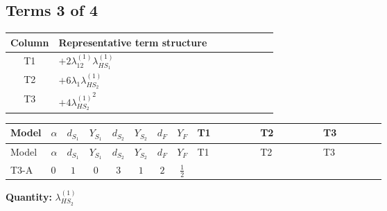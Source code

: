 \documentclass[8pt]{article}
\begin{document}
\begin{landscape}
\subsection*{Terms 3 of 4}
\begin{center}
\begin{tabular}{@{}c >{\raggedright\arraybackslash}p{0.82\linewidth}@{}}
\toprule
Column & Representative term structure \\
\midrule
T1 & \(\displaystyle +2 {\lambda_{12}^{(1)}} {\lambda_{HS_1}^{(1)}}\) \\
\midrule
T2 & \(\displaystyle +6 {\lambda_1} {\lambda_{HS_2}^{(1)}}\) \\
\midrule
T3 & \(\displaystyle +4 {\lambda_{HS_2}^{(1)}}^2\) \\
\midrule
\bottomrule
\end{tabular}
\end{center}
\smallskip
\tiny
\begin{longtable}{@{}llcccccc >{\raggedright\arraybackslash}p{0.21\linewidth} >{\raggedright\arraybackslash}p{0.21\linewidth} >{\raggedright\arraybackslash}p{0.21\linewidth}@{}}
\toprule
Model & $\alpha$ & $d_{S_1}$ & $Y_{S_1}$ & $d_{S_2}$ & $Y_{S_2}$ & $d_F$ & $Y_F$ & T1 & T2 & T3 \\
\midrule
\endfirsthead
\toprule
Model & $\alpha$ & $d_{S_1}$ & $Y_{S_1}$ & $d_{S_2}$ & $Y_{S_2}$ & $d_F$ & $Y_F$ & T1 & T2 & T3 \\
\midrule
\endhead
T3-A & $0$ & $1$ & $0$ & $3$ & $1$ & $2$ & $\frac{1}{2}$ & \scriptsize\adjustbox{max width=\linewidth}{$\begin{gathered} +2 {\lambda_{12}^{(1)}} {\lambda_{HS_1}^{(1)}}\end{gathered}$} & \scriptsize\adjustbox{max width=\linewidth}{$\begin{gathered} +6 {\lambda_1} {\lambda_{HS_2}^{(1)}}\end{gathered}$} & \scriptsize\adjustbox{max width=\linewidth}{$\begin{gathered} +4 {\lambda_{HS_2}^{(1)}}^2\end{gathered}$} \\
\midrule
\bottomrule
\end{longtable}
\clearpage
\noindent\textbf{Quantity: }$\lambda_{HS_2}^{(1)}$\par\smallskip

\end{landscape}
\end{document}
